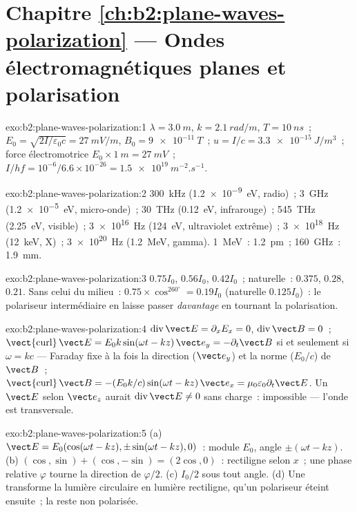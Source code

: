 \section*{Chapitre \ref{ch:b2:plane-waves-polarization} --- Ondes électromagnétiques planes et polarisation}

\begin{solution}{exo:b2:plane-waves-polarization:1}
$\lambda = \qty{3.0}{m}$, $k = \qty{2.1}{rad/m}$, $T = \qty{10}{ns}$~; $E_0 = \sqrt{2I/\varepsilon_0c}
= \qty{27}{mV/m}$, $B_0 = \qty{9e-11}{T}$~; $u = I/c = \qty{3.3e-15}{J/m^3}$~; force électromotrice
$E_0 \times \qty{1}{m} = \qty{27}{mV}$~; $I/hf = 10^{-6}/6.6 \times 10^{-26} = \qty{1.5e19}{m^{-2}.s^{-1}}$.
\end{solution}

\begin{solution}{exo:b2:plane-waves-polarization:2}
\qty{300}{kHz} (\qty{1.2e-9}{eV}, radio)~; \qty{3}{GHz} (\qty{1.2e-5}{eV}, micro-onde)~;
\qty{30}{THz} (\qty{0.12}{eV}, infrarouge)~; \qty{545}{THz} (\qty{2.25}{eV}, visible)~;
\qty{3e16}{Hz} (\qty{124}{eV}, ultraviolet extrême)~; \qty{3e18}{Hz} (\qty{12}{keV}, X)~;
\qty{3e20}{Hz} (\qty{1.2}{MeV}, gamma). \qty{1}{MeV}~: \qty{1.2}{pm}~; \qty{160}{GHz}~: \qty{1.9}{mm}.
\end{solution}

\begin{solution}{exo:b2:plane-waves-polarization:3}
$0.75I_0$, $0.56I_0$, $0.42I_0$~; naturelle~: $0.375$, $0.28$, $0.21$. Sans celui du
milieu~: $0.75 \times \cos^260^\circ = 0.19I_0$ (naturelle $0.125I_0$)~: le
polariseur intermédiaire en laisse passer \emph{davantage} en tournant la
polarisation.
\end{solution}

\begin{solution}{exo:b2:plane-waves-polarization:4}
$\operatorname{div}\vect E = \partial_xE_x = 0$, $\operatorname{div}\vect B = 0$~;
$\operatorname{\vect{curl}}\vect E = E_0k\sin(\omega t - kz)\,\vect e_y = -\partial_t\vect B$ si et seulement si $\omega =
kc$ --- Faraday fixe à la fois la direction ($\vect e_y$) et la norme
($E_0/c$) de $\vect B$~; $\operatorname{\vect{curl}}\vect B = -(E_0k/c)\sin(\omega t - kz)\,\vect e_x
= \mu_0\varepsilon_0\partial_t\vect E$. Un $\vect E$ selon $\vect e_z$ aurait $\operatorname{div}
\vect E \ne 0$ sans charge~: impossible --- l'onde est transversale.
\end{solution}

\begin{solution}{exo:b2:plane-waves-polarization:5}
(a) $\vect E = E_0(\cos(\omega t - kz), \pm\sin(\omega t - kz), 0)$~: module $E_0$,
angle $\pm(\omega t - kz)$. (b) $(\cos, \sin) + (\cos, -\sin) = (2\cos, 0)$~: rectiligne
selon $x$~; une phase relative $\varphi$ tourne la direction de $\varphi/2$. (c)
$I_0/2$ sous tout angle. (d) Une  transforme la lumière circulaire
en lumière rectiligne, qu'un polariseur éteint ensuite~; la 
reste non polarisée.
\end{solution}


